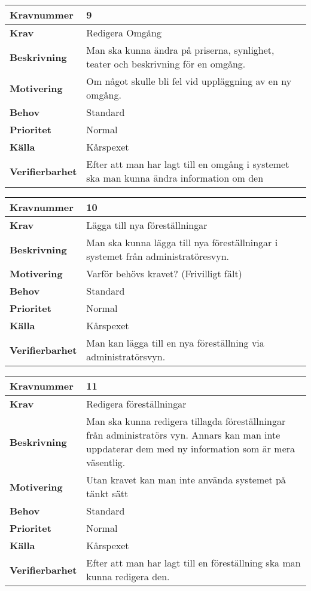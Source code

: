 \documentclass[a4paper, twoside, 11pt, titlepage]{article}
\begin{document}
\begin{tabular} { | p{3cm} | p{12.2cm} | }
	\hline
	\textbf{Kravnummer} & 9  \\
	\hline
	\textbf{Krav} & Redigera Omgång  \\
	\hline
	\textbf{Beskrivning} & Man ska kunna ändra på priserna, synlighet, teater och beskrivning för en omgång.  \\
	\hline
	\textbf{Motivering} & Om något skulle bli fel vid uppläggning av en ny omgång.  \\
	\hline
	\textbf{Behov} & Standard  \\
	\hline
	\textbf{Prioritet} & Normal  \\
	\hline
	\textbf{Källa} & Kårspexet  \\
	\hline
	\textbf{Verifierbarhet} & Efter att man har lagt till en omgång i systemet ska man kunna ändra information om den  \\
	\hline
\end{tabular}

\begin{tabular} { | p{3cm} | p{12.2cm} | }
	\hline
	\textbf{Kravnummer} & 10  \\
	\hline
	\textbf{Krav} & Lägga till nya föreställningar  \\
	\hline
	\textbf{Beskrivning} & Man ska kunna lägga till nya föreställningar i systemet från administratöresvyn.   \\
	\hline
	\textbf{Motivering} & Varför behövs kravet? (Frivilligt fält)  \\
	\hline
	\textbf{Behov} & Standard  \\
	\hline
	\textbf{Prioritet} & Normal  \\
	\hline
	\textbf{Källa} & Kårspexet  \\
	\hline
	\textbf{Verifierbarhet} & Man kan lägga till en nya föreställning via administratörsvyn.  \\
	\hline
\end{tabular}

\begin{tabular} { | p{3cm} | p{12.2cm} | }
	\hline
	\textbf{Kravnummer} & 11  \\
	\hline
	\textbf{Krav} & Redigera föreställningar  \\
	\hline
	\textbf{Beskrivning} & Man ska kunna redigera tillagda föreställningar från administratörs vyn. Annars kan man inte uppdaterar dem med ny information som är mera väsentlig.   \\
	\hline
	\textbf{Motivering} & Utan kravet kan man inte använda systemet på tänkt sätt  \\
	\hline
	\textbf{Behov} & Standard  \\
	\hline
	\textbf{Prioritet} & Normal  \\
	\hline
	\textbf{Källa} & Kårspexet  \\
	\hline
	\textbf{Verifierbarhet} & Efter att man har lagt till en föreställning ska man kunna redigera den.   \\
	\hline
\end{tabular}
\end{document}
